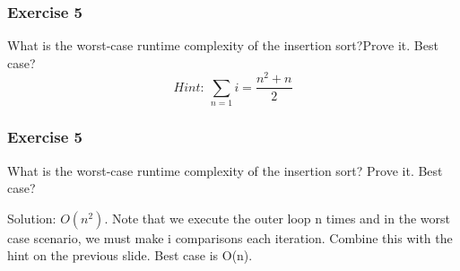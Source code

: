 \documentclass{beamer}
\begin{document}
\begin{frame}
\frametitle{Exercise 5}
What is the worst-case runtime complexity of the insertion sort?Prove it. Best case?\\

{\color{blue}$$Hint: \ \sum_{n=1} i=\frac{n^{2}+n}{2}$$}
  
\end{frame}

\begin{frame} [noframenumbering]
\frametitle{Exercise 5}
What is the worst-case runtime complexity of the insertion sort? Prove it. Best case?
 \\
 \vspace{1cm}
 
Solution: $O(n^{2})$. Note that we execute the outer loop n times and in the worst case scenario, we must make i comparisons each iteration. Combine this with the hint on the previous slide. Best case is O(n).

\end{frame}

 
 

 

 
 
\end{document}
